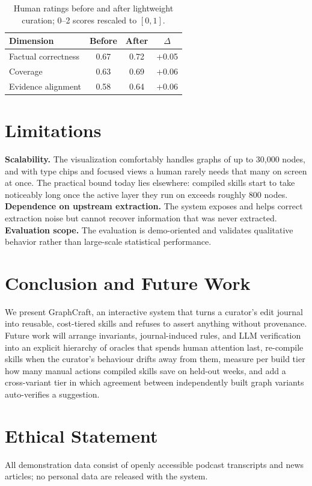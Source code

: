 \documentclass[sigconf]{acmart}
\begin{document}
\begin{table}[t]
\centering
\small
\begin{tabular*}{\columnwidth}{@{\extracolsep{\fill}}lccc}
\hline
\textbf{Dimension} & \textbf{Before} & \textbf{After} & $\Delta$ \\
\hline
Factual correctness & 0.67 & 0.72 & +0.05 \\
Coverage            & 0.63 & 0.69 & +0.06 \\
Evidence alignment  & 0.58 & 0.64 & +0.06 \\
\hline
\end{tabular*}
\caption{Human ratings before and after lightweight curation; 0--2 scores rescaled to $[0,1]$.}
\label{tab:graphrag_results_human}
\end{table}


\section{Limitations}
\textbf{Scalability.} The visualization comfortably handles graphs of up to 30{,}000 nodes, and with type chips and focused views a human rarely needs that many on screen at once. The practical bound today lies elsewhere: compiled skills start to take noticeably long once the active layer they run on exceeds roughly 800 nodes.
\textbf{Dependence on upstream extraction.} The system exposes and helps correct extraction noise but cannot recover information that was never extracted.
\textbf{Evaluation scope.} The evaluation is demo-oriented and validates qualitative behavior rather than large-scale statistical performance.

\section{Conclusion and Future Work}
We present GraphCraft, an interactive system that turns a curator's edit journal into reusable, cost-tiered skills and refuses to assert anything without provenance. Future work will arrange invariants, journal-induced rules, and LLM verification into an explicit hierarchy of oracles that spends human attention last, re-compile skills when the curator's behaviour drifts away from them, measure per build tier how many manual actions compiled skills save on held-out weeks, and add a cross-variant tier in which agreement between independently built graph variants auto-verifies a suggestion.

\section*{Ethical Statement}
All demonstration data consist of openly accessible podcast transcripts and news articles; no personal data are released with the system.



\end{document}
